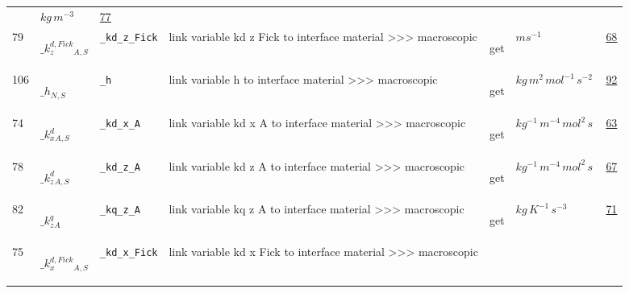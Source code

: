 \begin{longtable}{|p{1cm}|p{2.5cm}|p{4.5cm}|p{8cm}|p{3.0cm}|p{3cm}|p{1cm}|}
             & $ kg \,m^{-3} \, $
             &                 \hyperlink{"e:77"}{ 77 }
                 \\
            79
             & \hypertarget{"v:79"}{ $ {{\_k^{d,Fick}_z}}{_{A, S}} $}
             & \verb|_kd_z_Fick|
             & link variable kd z Fick to interface material >>> macroscopic
             & \begin{lay}get \end{lay}
             & $ m s^{-1} \, $
             &                 \hyperlink{"e:68"}{ 68 }
                 \\
            106
             & \hypertarget{"v:106"}{ $ {{\_h}}{_{N, S}} $}
             & \verb|_h|
             & link variable h to interface material >>> macroscopic
             & \begin{lay}get \end{lay}
             & $ kg \,m^{2} \,mol^{-1} \,s^{-2} \, $
             &                 \hyperlink{"e:92"}{ 92 }
                 \\
            74
             & \hypertarget{"v:74"}{ $ {{\_k^d_x}}{_{A, S}} $}
             & \verb|_kd_x_A|
             & link variable kd x A to interface material >>> macroscopic
             & \begin{lay}get \end{lay}
             & $ kg^{-1} \,m^{-4} \,mol^{2} \,s \, $
             &                 \hyperlink{"e:63"}{ 63 }
                 \\
            78
             & \hypertarget{"v:78"}{ $ {{\_k^d_z}}{_{A, S}} $}
             & \verb|_kd_z_A|
             & link variable kd z A to interface material >>> macroscopic
             & \begin{lay}get \end{lay}
             & $ kg^{-1} \,m^{-4} \,mol^{2} \,s \, $
             &                 \hyperlink{"e:67"}{ 67 }
                 \\
            82
             & \hypertarget{"v:82"}{ $ {{\_k^q_z}}{_{A}} $}
             & \verb|_kq_z_A|
             & link variable kq z A to interface material >>> macroscopic
             & \begin{lay}get \end{lay}
             & $ kg \,K^{-1} \,s^{-3} \, $
             &                 \hyperlink{"e:71"}{ 71 }
                 \\
            75
             & \hypertarget{"v:75"}{ $ {{\_k^{d,Fick}_x}}{_{A, S}} $}
             & \verb|_kd_x_Fick|
             & link variable kd x Fick to interface material >>> macroscopic

\end{longtable}
